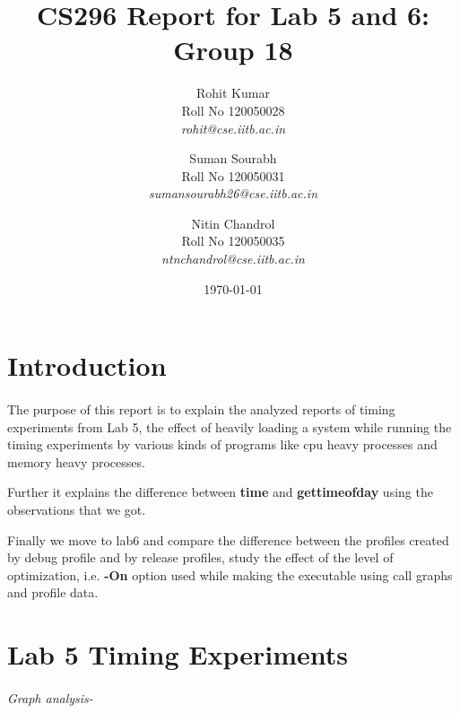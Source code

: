 \documentclass[11pt]{article}
\begin{document}
\title{CS296 Report for Lab 5 and 6:\\
		Group 18}
	
\author{Rohit Kumar \\
		\textup{Roll No 120050028} \\
		\textit{rohit@cse.iitb.ac.in}
	\and
	Suman Sourabh \\
	\textup{Roll No 120050031} \\
	\textit{sumansourabh26@cse.iitb.ac.in}
	\and
	Nitin Chandrol\\
	\textup{Roll No 120050035} \\
	\textit{ntnchandrol@cse.iitb.ac.in}
	}

\date{\today}

\maketitle

\section{Introduction}

	\paragraph{}
	The purpose of this report is to explain the analyzed reports of timing experiments from Lab 5,
	 the effect of heavily loading a system while running the timing experiments 
	 by various kinds of programs like cpu heavy processes and memory heavy processes.
	 
	Further it explains the difference between \textbf{time} and \textbf{gettimeofday} using the observations that 
	we got.
	
	Finally we move to lab6 and compare the difference between the profiles created by debug profile 
	and by release profiles, study the effect of the level of optimization, i.e. \textbf{-On} option used while making the 
	executable using call graphs and profile data.

\section{Lab 5 Timing Experiments}
\paragraph{}
	
	\textit{Graph analysis-}
\end{document}
